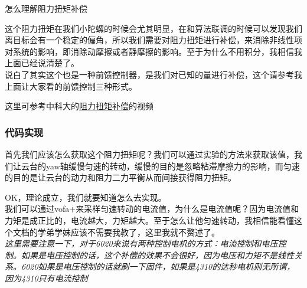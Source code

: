 \documentclass[UTF8,a4paper,12pt]{ctexart}
\begin{document}
\begin{titlebox}{怎么理解阻力扭矩补偿}
\begin{flushleft}
{            }
           \end{flushleft}
           \begin{flushleft}
            这个阻力扭矩在我们小陀螺的时候会尤其明显，在和算法联调的时候可以发现我们离目标会有一个稳定的偏角，所以我们需要对阻力扭矩进行补偿，来消除非线性项对系统的影响，即消除动摩擦或者静摩擦的影响。至于为什么不用积分，我相信我上面已经说清楚了。
            \\说白了其实这个也是一种前馈控制器，是我们对已知的量进行补偿，这个请参考我上面让大家看的前馈控制三种形式。
           \end{flushleft}
           
           
          \end{titlebox}
          这里可参考中科大的\href {https://www.bilibili.com/video/BV1xJo4YPEuS?spm_id_from=333.788.videopod.sectionsvd_source=b02f21f21dd17ebeef8dac9338c9d06c}{阻力扭矩补偿}的视频
          \subsubsection{代码实现}
          \begin{flushleft}
            首先我们应该怎么获取这个阻力扭矩呢？我们可以通过实验的方法来获取该值，我们让云台的yaw轴缓慢匀速的转动，缓慢的目的是忽略粘滞摩擦力的影响，而匀速的目的是让云台的动力和阻力二力平衡从而间接获得阻力扭矩。\\
            
          \end{flushleft}
          \begin{flushleft}
            OK，理论成立，我们就要知道怎么去实现。\\
            我们可以通过vofa+来采样匀速转动的电流值，为什么是电流值呢？因为电流值和力矩是成正比的，电流越大，力矩越大。至于怎么让他匀速转动，我相信能看懂这个文档的学弟学妹应该不需要我教了，这里我就不赘述了。\\
            \textit{这里需要注意一下，对于6020来说有两种控制电机的方式：电流控制和电压控制。如果是电压控制的话，这个补偿的效果不会很好，因为电压和力矩不是线性关系。6020如果是电压控制的话就刷一下固件，如果是4310的达秒电机则无所谓，因为4310只有电流控制}
          \end{flushleft} 
          
\end{document}
